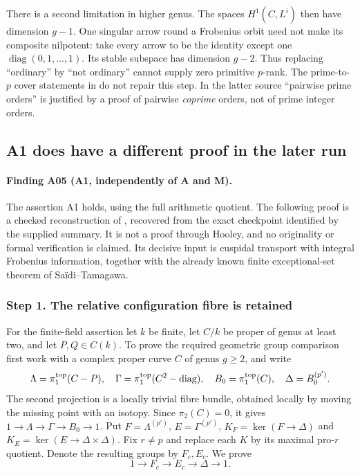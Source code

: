 \documentclass[11pt,a4paper]{article}
\begin{document}
There is a second limitation in higher genus. The spaces $H^1(C,L^i)$
then have dimension $g-1$. One singular arrow round a Frobenius orbit
need not make its composite nilpotent: take every arrow to be the
identity except one $\operatorname{diag}(0,1,\ldots,1)$.
Its stable subspace has dimension $g-2$. Thus replacing ``ordinary''
by ``not ordinary'' cannot supply zero primitive $p$-rank. The prime-to-$p$ cover statements in
\cite[Propositions~2.3--2.4]{PopSaidi} do not repair this
step. In the latter source ``pairwise prime orders'' is justified by
a proof of pairwise \emph{coprime} orders, not of prime integer orders.

\subsection{A1 does have a different proof in the later run}

\paragraph{Finding A05 (A1, independently of A and M).}
The assertion A1 holds, using the full arithmetic quotient. The
following proof is a checked reconstruction of
\cite[A.2--A.5, A.14--A.19, A.30--A.33]{A1run}, recovered from the
exact checkpoint identified by the supplied summary. It is not a
proof through Hooley, and no originality or formal verification is
claimed. Its decisive input is cuspidal transport with integral
Frobenius information, together with the already known finite
exceptional-set theorem of Sa\"idi--Tamagawa.

\subsubsection*{Step 1. The relative configuration fibre is retained}
For the finite-field assertion let $k$ be finite, let $C/k$ be proper
of genus at least two, and let $P,Q\in C(k)$. To prove the required
geometric group comparison first work with a complex proper curve
$C$ of genus $g\ge2$, and write
\[
 \Lambda=\pi_1^{\rm top}(C-P),\quad
 \Gamma=\pi_1^{\rm top}(C^2-\operatorname{diag}),\quad
 B_0=\pi_1^{\rm top}(C),\quad \Delta=B_0^{(p')}.
\]
The second projection is a locally trivial fibre bundle, obtained
locally by moving the missing point with an isotopy. Since
$\pi_2(C)=0$, it gives $1\to\Lambda\to\Gamma\to B_0\to1$.
Put $F=\Lambda^{(p')}$, $E=\Gamma^{(p')}$,
$K_F=\ker(F\to\Delta)$ and
$K_E=\ker(E\to\Delta\times\Delta)$. Fix $r\ne p$ and replace
each $K$ by its maximal pro-$r$ quotient. Denote the resulting
groups by $F_c,E_c$. We prove
\[
 1\longrightarrow F_c\longrightarrow E_c\longrightarrow\Delta
 \longrightarrow1. \tag{A05.1}
\]
\end{document}
